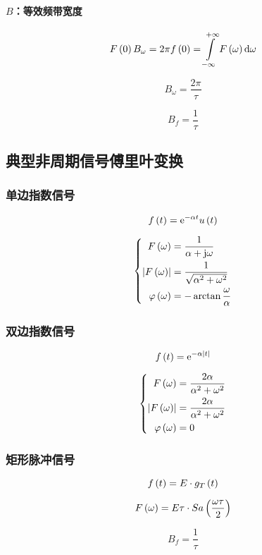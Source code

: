 \documentclass{article}
\begin{document}
\paragraph{$B$：等效频带宽度}

\[F\pare{0}B_\omega=2\pi f\pare{0}=\impint \fw\d\omega\]

\[B_\omega=\frac{2\pi}\tau\]

\[B_f=\frac1\tau\]

\subsection{典型非周期信号傅里叶变换}

\subsubsection{单边指数信号}

\[f\left(t\right)=\mathrm e^{-\alpha t}u\left(t\right)\]

\[\left\{\begin{aligned}
        F\left(\omega\right)                  & =\frac1{\alpha+\mathrm j\omega}          \\
        \left|F\left(\omega\right)\right|            & =\frac1{\sqrt{\alpha^2+\omega^2}} \\
        \varphi\left(\omega\right) & =-\arctan\frac\omega\alpha
    \end{aligned}\right.\]

\subsubsection{双边指数信号}

\[f\left(t\right)=\mathrm e^{-\alpha\left|t\right|}\]

\[\left\{\begin{aligned}
        F\left(\omega\right)                  & =\frac{2\alpha}{\alpha^2+\omega^2} \\
        \left|F\left(\omega\right)\right|            & =\frac{2\alpha}{\alpha^2+\omega^2} \\
        \varphi\left(\omega\right) & =0
    \end{aligned}\right.\]

\subsubsection{矩形脉冲信号}

\[f\left(t\right)=E\cdot g_T\left(t\right)\]

\[F\left(\omega\right)=E\tau\cdot Sa\left(\frac{\omega\tau}2\right)\]

\[B_f=\frac1\tau\]
\end{document}
